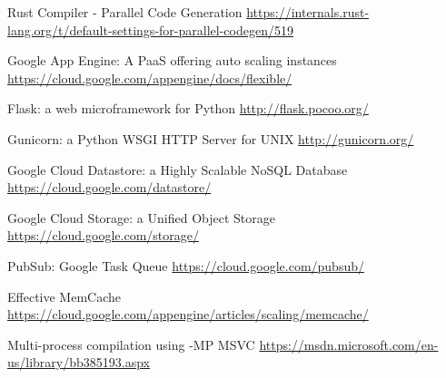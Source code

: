 \documentclass[conference]{IEEEtran}
\begin{document}
\begin{thebibliography}{00}

    Rust Compiler - Parallel Code Generation
    \url{https://internals.rust-lang.org/t/default-settings-for-parallel-codegen/519}


    Google App Engine: A PaaS offering auto scaling instances
    \url{https://cloud.google.com/appengine/docs/flexible/}

    Flask: a web microframework for Python
    \url{http://flask.pocoo.org/}

    Gunicorn: a Python WSGI HTTP Server for UNIX
    \url{http://gunicorn.org/}

    Google Cloud Datastore: a Highly Scalable NoSQL Database
    \url{https://cloud.google.com/datastore/}

    Google Cloud Storage: a Unified Object Storage
    \url{https://cloud.google.com/storage/}

   PubSub: Google Task Queue
    \url{https://cloud.google.com/pubsub/}

   Effective MemCache
    \url{https://cloud.google.com/appengine/articles/scaling/memcache/}

 	Multi-process compilation using -MP MSVC
 	\url{https://msdn.microsoft.com/en-us/library/bb385193.aspx}

\end{thebibliography}
\end{document}
